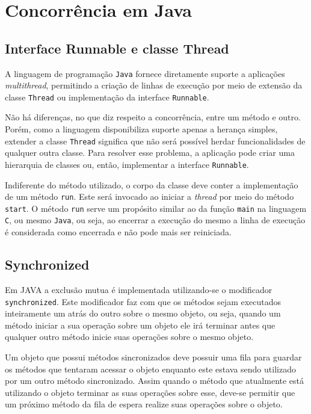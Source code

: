\chapter{Concorrência em Java}
\label{cha:concjava}

\section{Interface Runnable e classe Thread}

A linguagem de programação \texttt{Java} fornece diretamente suporte a
aplicações \textit{multithread}, permitindo a criação de linhas de
execução por meio de extensão da classe \verb!Thread! ou implementação
da interface \verb!Runnable!.

Não há diferenças, no que diz respeito a concorrência, entre um método
e outro. Porém, como a linguagem disponibiliza suporte apenas a
herança simples, extender a classe \verb!Thread! significa que não
será possível herdar funcionalidades de qualquer outra classe. Para
resolver esse problema, a aplicação pode criar uma hierarquia de
classes ou, então, implementar a interface \verb!Runnable!.

Indiferente do método utilizado, o corpo da classe deve conter a
implementação de um método \verb!run!. Este será invocado ao iniciar a
\textit{thread} por meio do método \verb!start!. O método \verb!run!
serve um propósito similar ao da função \verb!main! na linguagem
\texttt{C}, ou mesmo \texttt{Java}, ou seja, ao encerrar a execução do
mesmo a linha de execução é considerada como encerrada e não pode mais
ser reiniciada.

\section{Synchronized}

Em JAVA a exclusão mutua é implementada utilizando-se o modificador
\texttt{synchronized}. Este modificador faz com que os métodos sejam
executados inteiramente um atrás do outro sobre o mesmo objeto, ou seja,
quando um método iniciar a sua operação sobre um objeto ele irá terminar
antes que qualquer outro método inicie suas operações sobre o mesmo objeto.

Um objeto que possui métodos sincronizados deve possuir uma fila para
guardar os métodos que tentaram acessar o objeto enquanto este estava sendo
utilizado por um outro método sincronizado. Assim quando o método que
atualmente está utilizando o objeto terminar as suas operações sobre esse,
deve-se permitir que um próximo método da fila de espera realize suas
operações sobre o objeto.

